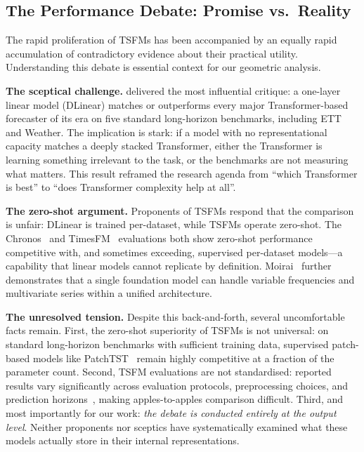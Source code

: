 \subsection{The Performance Debate: Promise vs.\ Reality}
\label{sec:rel_debate}

The rapid proliferation of TSFMs has been accompanied by an equally rapid
accumulation of contradictory evidence about their practical utility.
Understanding this debate is essential context for our geometric analysis.

\textbf{The sceptical challenge.}
\citet{zeng2023transformers} delivered the most influential critique:
a one-layer linear model (DLinear) matches or outperforms every major
Transformer-based forecaster of its era on five standard long-horizon benchmarks,
including ETT and Weather.
The implication is stark: if a model with no representational capacity matches a
deeply stacked Transformer, either the Transformer is learning something irrelevant
to the task, or the benchmarks are not measuring what matters.
This result reframed the research agenda from ``which Transformer is best'' to
``does Transformer complexity help at all''.

\textbf{The zero-shot argument.}
Proponents of TSFMs respond that the comparison is unfair: DLinear is trained
per-dataset, while TSFMs operate zero-shot.
The Chronos~\cite{ansari2024chronos} and TimesFM~\cite{das2024timesfm}
evaluations both show zero-shot performance competitive with, and sometimes
exceeding, supervised per-dataset models---a capability that linear models
cannot replicate by definition.
Moirai~\cite{woo2024moirai} further demonstrates that a single foundation model
can handle variable frequencies and multivariate series within a unified
architecture.

\textbf{The unresolved tension.}
Despite this back-and-forth, several uncomfortable facts remain.
First, the zero-shot superiority of TSFMs is not universal: on standard
long-horizon benchmarks with sufficient training data, supervised patch-based
models like PatchTST~\cite{nie2023patchtst} remain highly competitive at a
fraction of the parameter count.
Second, TSFM evaluations are not standardised: reported results vary
significantly across evaluation protocols, preprocessing choices, and
prediction horizons~\cite{woo2024moirai}, making apples-to-apples comparison
difficult.
Third, and most importantly for our work: \emph{the debate is conducted
entirely at the output level}.
Neither proponents nor sceptics have systematically examined what these models
actually store in their internal representations.

